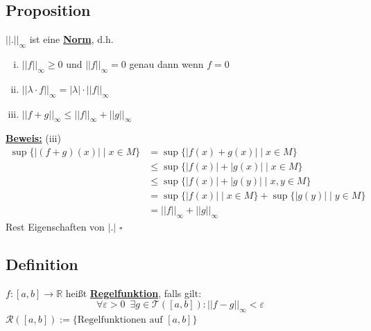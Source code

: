 \subsection{Proposition} %
\label{sub:proposition}
$|| . ||_{\infty} $ ist eine \underline{\textbf{Norm}}, d.h.
\begin{enumerate}[(i)]
	\item $|| f||_{\infty} \ge 0$ und $||f||_{\infty}=0$ genau dann wenn $f=0$
	\item $||\lambda \cdot f||_{\infty} = |\lambda | \cdot ||f||_{\infty}$
	\item $||f+g||_{\infty} \le ||f||_{\infty} + ||g||_{\infty}$
\end{enumerate}
\underline{\textbf{Beweis:}} (iii) \\
\begin{align*}
	\sup \{ | (f+g)(x)| \mid x \in M \} &= \sup \{ |f(x)+ g(x)| \mid x \in M \} \\
	&\le	\sup \{ |f(x)| + |g(x)| \mid x \in M  \} \\
	&\le \sup \{ |f(x)| + |g(y)| \mid x,y \in M \} \\
	&= \sup \{ |f(x)| \mid x \in M \} + \sup \{ |g(y)| \mid y \in M \} \\
	&= ||f||_{\infty}+ ||g||_{\infty}
\end{align*}
Rest Eigenschaften von $|.|$ \hfill \( \square \)

\subsection{Definition} %
\label{sub:definition}
$f : [a,b] \to \mathds{R}$ heißt \underline{\textbf{Regelfunktion}}, falls gilt: 
\[
	\forall \varepsilon >0 \enspace \exists g \in \mathcal{T} ([a,b]) : ||f-g||_\infty < \varepsilon
\]
$\mathcal{R}( [a,b]) := \{ \text{Regelfunktionen auf } [a,b] \}$

